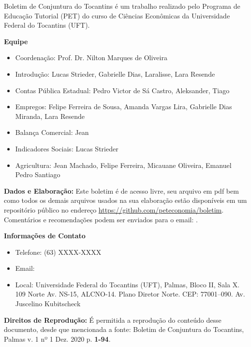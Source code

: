 \begin{tcolorbox}[colback=boxbackground, colframe=boxbackground, arc=0mm, top=15pt]
Boletim de Conjuntura do Tocantins é um trabalho realizado pelo Programa de Educação Tutorial (PET) do curso de Ciências Econômicas da Universidade Federal do Tocantins (UFT).
\\
\par{\bf Equipe}
\begin{itemize}
	\item Coordenação: Prof. Dr. Nilton Marques de Oliveira
	\item Introdução: Lucas Strieder, Gabrielle Dias, Laralisse, Lara Resende
	\item Contas Pública Estadual: Pedro Victor de Sá Castro, Aleksander, Tiago
	\item Empregos: Felipe Ferreira de Sousa, Amanda Vargas Lira, Gabrielle Dias Miranda, Lara Resende
	\item Balança Comercial: Jean
	\item Indicadores Sociais: Lucas Strieder
	\item Agricultura: Jean Machado, Felipe Ferreira, Micauane Oliveira, Emanuel Pedro Santiago
\end{itemize}
\par{\bf Dados e Elaboração:}
Este boletim é de acesso livre, seu arquivo em pdf bem como todos os demais arquivos usados na sua elaboração estão disponíveis em um repositório público no endereço \url{https://github.com/peteconomia/boletim}. Comentários e recomendações podem ser enviados para o email: .
\\
\par{\bf Informações de Contato}
\begin{itemize}
	\item{Telefone:} (63) XXXX-XXXX
	\item{Email:} 
	\item{Local:} Universidade Federal do Tocantins (UFT), Palmas, Bloco II, Sala X. 109 Norte Av. NS-15, ALCNO-14. Plano Diretor Norte. CEP: 77001--090. Av. Juscelino Kubitscheck
\end{itemize}
\par{\bf Direitos de Reprodução:}
É permitida a reprodução do conteúdo desse documento, desde que mencionada a fonte: Boletim de Conjuntura do Tocantins, Palmas v. 1 nº 1 Dez. 2020 p. \textbf{1-94}.
\end{tcolorbox}


